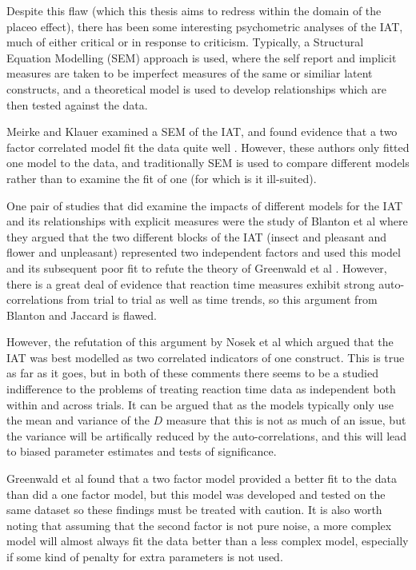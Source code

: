 Despite this flaw (which this thesis aims to redress within the domain of the placeo effect), there has been some interesting psychometric analyses of the IAT, much of either critical or in response to criticism. Typically, a Structural Equation Modelling (SEM) approach is used, where the self report and implicit measures are taken to be imperfect measures of the same or similiar latent constructs, and a theoretical model is used to develop relationships which are then tested against the data. 

Meirke and Klauer examined a SEM of the IAT, and found evidence that a two factor correlated model fit the data quite well \cite{Mierke2003}. However, these authors only fitted one model to the data, and traditionally SEM is used to compare different models rather than to examine the fit of one (for which is it ill-suited). 

One pair of studies that did examine the impacts of different models for the IAT and its relationships with explicit measures were the study of Blanton et al \cite{Blanton2006a} where they argued that the two different blocks of the IAT (insect and pleasant and flower and unpleasant) represented two independent factors and used this model and its subsequent poor fit to refute the theory of Greenwald et al \cite{greenwald2002}. However, there is a great deal of evidence that reaction time measures exhibit strong auto-correlations from trial to trial \cite{craigmile2010hierarchical} as well as time trends, so this argument from Blanton and Jaccard is flawed. 

However, the refutation of this argument by Nosek et al \cite{Nosek2007} which argued that the IAT was best modelled as two correlated indicators of one construct. This is true as far as it goes, but in both of these comments there seems to be a studied indifference to the problems of treating reaction time data as independent both within and across trials. It can be argued that as the models typically only use the mean and variance of the $D$ measure that this is not as much of an issue, but the variance will be artifically reduced by the auto-correlations, and this will lead to biased parameter estimates and tests of significance. 

Greenwald et al \cite{Greenwald2000} found that a two factor model provided a better fit to the data than did a one factor model, but this model was developed and tested on the same dataset so these findings must be treated with caution. It is also worth noting that assuming that the second factor is not pure noise, a more complex model will almost always fit the data better than a less complex model, especially if some kind of penalty for extra parameters is not used. 

